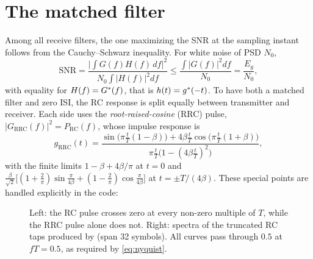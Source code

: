 \section{The matched filter}
Among all receive filters, the one maximizing the SNR at the sampling instant follows from the
Cauchy--Schwarz inequality. For white noise of PSD $N_0$,
\begin{equation}
  \mathrm{SNR}=\frac{\big|\int G(f)H(f)\,df\big|^2}{N_0\int|H(f)|^2df}
  \le\frac{\int|G(f)|^2df}{N_0}=\frac{E_g}{N_0},
\end{equation}
with equality for $H(f)=G^{*}(f)$, that is $h(t)=g^{*}(-t)$. To have both a matched filter
and zero ISI, the RC response is split equally between transmitter and receiver. Each side
uses the \emph{root-raised-cosine} (RRC) pulse, $|G_{\mathrm{RRC}}(f)|^2=P_{\mathrm{RC}}(f)$,
whose impulse response is
\begin{equation}
  g_{\mathrm{RRC}}(t)=\frac{\sin\big(\pi\frac tT(1-\beta)\big)+4\beta\frac tT\cos\big(\pi\frac tT(1+\beta)\big)}
  {\pi\frac tT\big(1-(4\beta\frac tT)^2\big)},
\end{equation}
with the finite limits $1-\beta+4\beta/\pi$ at $t=0$ and
$\frac{\beta}{\sqrt2}\big[(1+\frac2\pi)\sin\frac{\pi}{4\beta}+(1-\frac2\pi)\cos\frac{\pi}{4\beta}\big]$ at
$t=\pm T/(4\beta)$. These special points are handled explicitly in the code:

\begin{figure}[htbp]
\centering
{}
\caption{Left: the RC pulse crosses zero at every non-zero multiple of $T$, while the RRC pulse
alone does not. Right: spectra of the truncated RC taps produced by  (span
32 symbols). All curves pass through $0.5$ at $fT=0.5$, as required by \cref{eq:nyquist}.}
\label{fig:pulses}
\end{figure}

